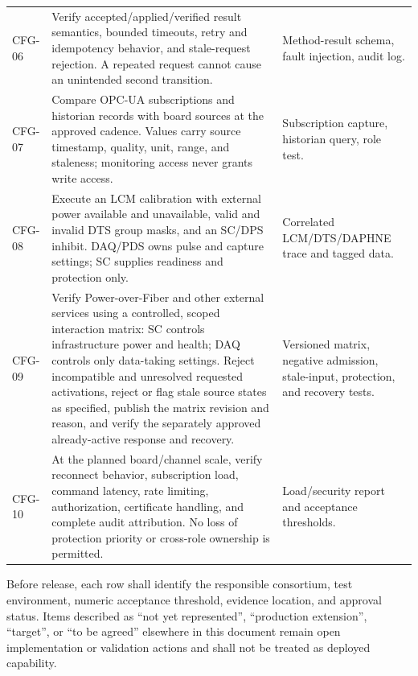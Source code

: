 \begin{longtable}{@{}p{2.2cm}p{8.2cm}p{4.4cm}@{}}
CFG-06 & Verify accepted/applied/verified result semantics, bounded timeouts, retry and idempotency behavior, and stale-request rejection. A repeated request cannot cause an unintended second transition. & Method-result schema, fault injection, audit log. \\
CFG-07 & Compare OPC-UA subscriptions and historian records with board sources at the approved cadence. Values carry source timestamp, quality, unit, range, and staleness; monitoring access never grants write access. & Subscription capture, historian query, role test. \\
CFG-08 & Execute an LCM calibration with external power available and unavailable, valid and invalid DTS group masks, and an SC/DPS inhibit. DAQ/PDS owns pulse and capture settings; SC supplies readiness and protection only. & Correlated LCM/DTS/DAPHNE trace and tagged data. \\
CFG-09 & Verify Power-over-Fiber and other external services using a controlled, scoped interaction matrix: SC controls infrastructure power and health; DAQ controls only data-taking settings. Reject incompatible and unresolved requested activations, reject or flag stale source states as specified, publish the matrix revision and reason, and verify the separately approved already-active response and recovery. & Versioned matrix, negative admission, stale-input, protection, and recovery tests. \\
CFG-10 & At the planned board/channel scale, verify reconnect behavior, subscription load, command latency, rate limiting, authorization, certificate handling, and complete audit attribution. No loss of protection priority or cross-role ownership is permitted. & Load/security report and acceptance thresholds. \\
\bottomrule
\end{longtable}

Before release, each row shall identify the responsible consortium, test environment,
numeric acceptance threshold, evidence location, and approval status. Items described as
``not yet represented'', ``production extension'', ``target'', or ``to be agreed'' elsewhere
in this document remain open implementation or validation actions and shall not be treated
as deployed capability.
